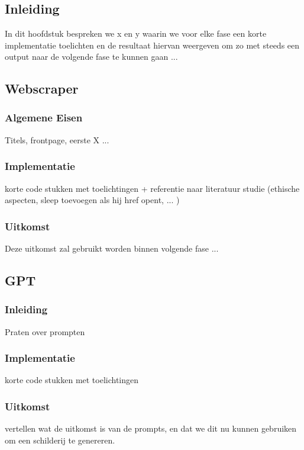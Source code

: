 \chapter{}%
\label{ch:proof-of-concept}
\section{Inleiding}
In dit hoofdstuk bespreken we x en y waarin we voor elke fase een korte implementatie toelichten en de resultaat hiervan weergeven om zo met steeds een output naar de volgende fase te kunnen gaan ... 

\section{Webscraper}
\subsection{Algemene Eisen}
Titels, frontpage, eerste X ...
\subsection{Implementatie}
korte code stukken met toelichtingen + referentie naar literatuur studie (ethische aspecten, sleep toevoegen als hij href opent, ... )
\subsection{Uitkomst}
Deze uitkomst zal gebruikt worden binnen volgende fase ...  \\

\section{GPT}
\subsection{Inleiding}
Praten over prompten
\subsection{Implementatie}
korte code stukken met toelichtingen
\subsection{Uitkomst}
vertellen wat de uitkomst is van de prompts, en dat we dit nu kunnen gebruiken om een schilderij te genereren.

